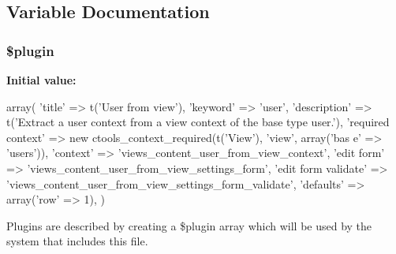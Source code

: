 \subsection{Variable Documentation}
\hypertarget{user__from__view_8inc_ada8a7130088351710bb02ed622d6bf65}{
\subsubsection[{\$plugin}]{\setlength{\rightskip}{0pt plus 5cm}\$plugin}}
\label{user__from__view_8inc_ada8a7130088351710bb02ed622d6bf65}
{\bfseries Initial value:}
\begin{DoxyCode}
 array(
  'title' => t('User from view'),
  'keyword' => 'user',
  'description' => t('Extract a user context from a view context of the base type
       user.'),
  'required context' => new ctools_context_required(t('View'), 'view', array('bas
      e' => 'users')),
  'context' => 'views_content_user_from_view_context',
  'edit form' => 'views_content_user_from_view_settings_form',
  'edit form validate' => 'views_content_user_from_view_settings_form_validate',
  'defaults' => array('row' => 1),
)
\end{DoxyCode}
Plugins are described by creating a \$plugin array which will be used by the system that includes this file. 